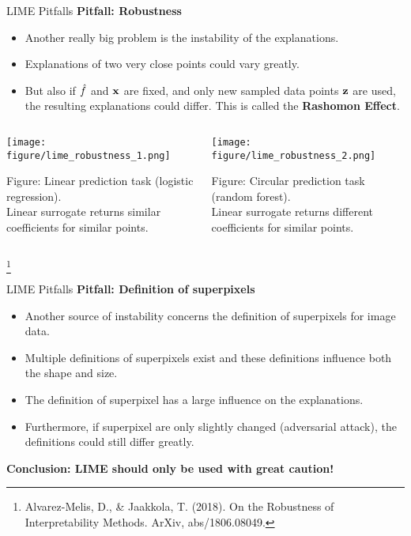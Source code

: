 \documentclass[11pt,compress,t,notes=noshow, aspectratio=169, xcolor=table]{beamer}
\begin{document}
\begin{vbframe}{LIME Pitfalls}
\textbf{Pitfall: Robustness}
\begin{itemize}
	\item Another really big problem is the instability of the explanations. 
	\item Explanations of two very close points could vary greatly. 
	\item But also if $\hat{f}$ and $\mathbf{x}$ are fixed, and only new sampled data points $\mathbf{z}$ are used, the resulting explanations could differ. This is called the \textbf{Rashomon Effect}.
\end{itemize}
\vspace{-0.7cm}
\begin{columns}
	\begin{column}{0.48\textwidth}
		\begin{center}
		
		\texttt{[image: figure/lime\_robustness\_1.png]}
		
		\tiny{Figure: Linear prediction task (logistic regression). \\Linear surrogate returns similar coefficients for similar points.}
		
		\end{center}
	\end{column}
	\begin{column}{0.48\textwidth}
		\begin{center}
	\texttt{[image: figure/lime\_robustness\_2.png]}
	
	\tiny{Figure: Circular prediction task (random forest). \\Linear surrogate returns different coefficients for similar points.}
	
	\end{center}
\end{column}
\end{columns}
\vspace{-0.2cm}
\footnote[frame]{Alvarez-Melis, D., \& Jaakkola, T. (2018). On the Robustness of Interpretability Methods. ArXiv, abs/1806.08049.}
\end{vbframe}

\begin{vbframe}{LIME Pitfalls}
\textbf{Pitfall: Definition of superpixels}
\begin{itemize}
	\item Another source of instability concerns the definition of superpixels for image data. 
	\item Multiple definitions of superpixels exist and these definitions influence both the shape and size. 
	\item The definition of superpixel has a large influence on the explanations. 
	\item Furthermore, if superpixel are only slightly changed (adversarial attack), the definitions could still differ greatly.  
\end{itemize}
\vspace{0.5cm}
\textbf{Conclusion: LIME should only be used with great caution!}

\end{vbframe}
\end{document}

